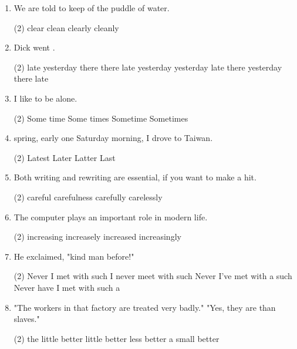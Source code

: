 \begin{enumerate}
\item We are told to keep \ttu of the puddle of water.
  \begin{tasks}(2)
    \task clear
    \task clean
    \task clearly
    \task cleanly
  \end{tasks}

\item Dick went \ttu.
  \begin{tasks}(2)
    \task late yesterday there
    \task there late yesterday
    \task yesterday late there
    \task yesterday there late
  \end{tasks}

\item \ttu I like to be alone.
  \begin{tasks}(2)
    \task Some time
    \task Some times
    \task Sometime
    \task Sometimes
  \end{tasks}

\item \ttu spring, early one Saturday morning, I drove to Taiwan.
  \begin{tasks}(2)
    \task Latest
    \task Later
    \task Latter
    \task Last
  \end{tasks}

\item Both writing and rewriting \ttu are essential, if you want to make a hit.
  \begin{tasks}(2)
    \task careful
    \task carefulness
    \task carefully
    \task carelessly
  \end{tasks}

\item The computer plays an \ttu important role in modern life.
  \begin{tasks}(2)
    \task increasing
    \task increasely
    \task increased
    \task increasingly
  \end{tasks}

\item He exclaimed, "\ttu kind man before!"
  \begin{tasks}(2)
    \task Never I met with such
    \task I never meet with such
    \task Never I've met with a such
    \task Never have I met with such a
  \end{tasks}

\item "The workers in that factory are treated very badly." "Yes, they are \ttu than slaves."
  \begin{tasks}(2)
    \task the little better
    \task little better
    \task less better
    \task a small better
  \end{tasks}


\end{enumerate}
